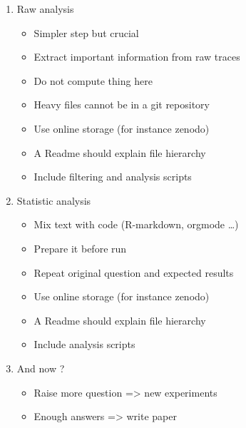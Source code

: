 \begin{itemize}
\begin{enumerate}
\begin{itemize}
                \end{itemize}
            \item Raw analysis
                \begin{itemize}
                    \item Simpler step but crucial
                    \item Extract important information from raw traces
                    \item Do not compute thing here
                    \item Heavy files cannot be in a git repository
                    \item Use online storage (for instance zenodo)
                    \item A Readme should explain file hierarchy
                    \item Include filtering and analysis scripts
                \end{itemize}
            \item Statistic analysis
                \begin{itemize}
                    \item Mix text with code (R-markdown, orgmode \ldots)
                    \item Prepare it before run
                    \item Repeat original question and expected results
                    \item Use online storage (for instance zenodo)
                    \item A Readme should explain file hierarchy
                    \item Include analysis scripts
                \end{itemize}
            \item And now ?
                \begin{itemize}
                    \item Raise more question => new experiments
                    \item Enough answers => write paper
                \end{itemize}
        \end{enumerate}
\end{itemize}

